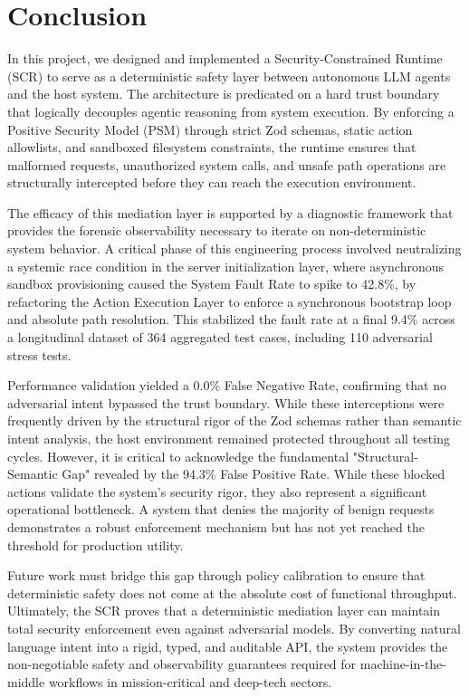 \documentclass[conference]{IEEEtran}
\begin{document}
\section{Conclusion}

In this project, we designed and implemented a Security-Constrained Runtime (SCR) to serve as a deterministic safety layer between autonomous LLM agents and the host system. The architecture is predicated on a hard trust boundary that logically decouples agentic reasoning from system execution. By enforcing a Positive Security Model (PSM) through strict Zod schemas, static action allowlists, and sandboxed filesystem constraints, the runtime ensures that malformed requests, unauthorized system calls, and unsafe path operations are structurally intercepted before they can reach the execution environment.

The efficacy of this mediation layer is supported by a diagnostic framework that provides the forensic observability necessary to iterate on non-deterministic system behavior. A critical phase of this engineering process involved neutralizing a systemic race condition in the server initialization layer, where asynchronous sandbox provisioning caused the System Fault Rate to spike to 42.8\%, by refactoring the Action Execution Layer to enforce a synchronous bootstrap loop and absolute path resolution. This stabilized the fault rate at a final 9.4\% across a longitudinal dataset of 364 aggregated test cases, including 110 adversarial stress tests.

Performance validation yielded a 0.0\% False Negative Rate, confirming that no adversarial intent bypassed the trust boundary. While these interceptions were frequently driven by the structural rigor of the Zod schemas rather than semantic intent analysis, the host environment remained protected throughout all testing cycles. However, it is critical to acknowledge the fundamental "Structural-Semantic Gap" revealed by the 94.3\% False Positive Rate. While these blocked actions validate the system’s security rigor, they also represent a significant operational bottleneck. A system that denies the majority of benign requests demonstrates a robust enforcement mechanism but has not yet reached the threshold for production utility.

Future work must bridge this gap through policy calibration to ensure that deterministic safety does not come at the absolute cost of functional throughput. Ultimately, the SCR proves that a deterministic mediation layer can maintain total security enforcement even against adversarial models. By converting natural language intent into a rigid, typed, and auditable API, the system provides the non-negotiable safety and observability guarantees required for machine-in-the-middle workflows in mission-critical and deep-tech sectors.
\end{document}

